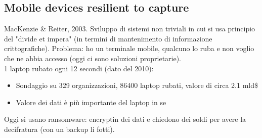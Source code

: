\documentclass[16px]{article}
\begin{document}
\subsection{Mobile devices resilient to capture}
MacKenzie \& Reiter, 2003. Sviluppo di sistemi non triviali in cui si usa principio del "divide et impera" (in termini di mantenimento di informazione crittografiche). Problema: ho un terminale mobile, qualcuno lo ruba e non voglio che ne abbia accesso (oggi ci sono soluzioni proprietarie).\\ 1 laptop rubato ogni 12 secondi (dato del 2010):
\begin{itemize}
\item Sondaggio su 329 organizzazioni, 86400 laptop rubati, valore di circa 2.1 mld\$
\item Valore dei dati è più importante del laptop in se
\end{itemize}
Oggi si usano ransomware: encryptin dei dati e chiedono dei soldi per avere la decifratura (con un backup li fotti).
\end{document}
